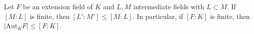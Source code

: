 Let $F$ be an extension field of $K$ and $L, M$ intermediate fields with $L \subset M$. If $[M : L]$ is finite, then $[L' : M'] \leq [M : L]$. In particular, if $[F : K]$ is finite, then $|\mathrm{Aut}_K F| \leq [F : K]$.
